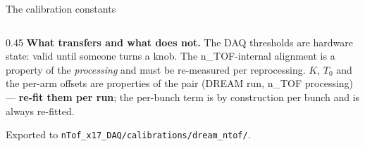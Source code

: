 \documentclass[aspectratio=169,10pt]{beamer}
\newcommand{\hl}[1]{\textcolor{orange!75!black}{\textbf{#1}}}
\newcommand{\ntof}{n\_TOF}
\begin{document}
\begin{frame}{The calibration constants}
\begin{columns}[T]
\begin{column}{0.45\textwidth}
\footnotesize
\hl{What transfers and what does not.} The DAQ thresholds are hardware state:
valid until someone turns a knob. The \ntof{}-internal alignment is a property
of the \emph{processing} and must be re-measured per reprocessing. $K$, $T_0$
and the per-arm offsets are properties of the pair (DREAM run,
\ntof{} processing) --- \textbf{re-fit them per run}; the per-bunch term is by
construction per bunch and is always re-fitted.
\vspace{0.4em}

Exported to \texttt{nTof\_x17\_DAQ/calibrations/dream\_ntof/}.
\end{column}
\end{columns}
\end{frame}

\end{document}
